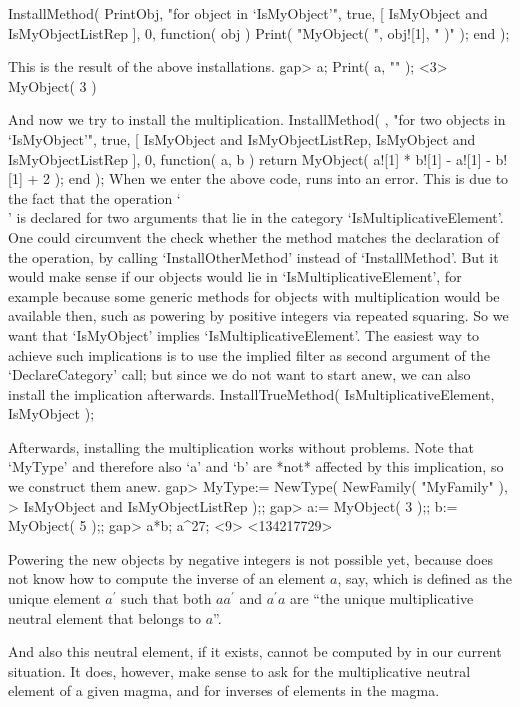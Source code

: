 InstallMethod( PrintObj,
    "for object in `IsMyObject'",
    true,
    [ IsMyObject and IsMyObjectListRep ], 0,
    function( obj )
    Print( "MyObject( ", obj![1], " )" );
    end );
\endtt

This is the result of the above installations.
\begintt
gap> a; Print( a, "\n" );
<3>
MyObject( 3 )
\endtt

And now we try to install the multiplication.
\begintt
InstallMethod( \*,
    "for two objects in `IsMyObject'",
    true,
    [ IsMyObject and IsMyObjectListRep,
      IsMyObject and IsMyObjectListRep ], 0,
    function( a, b )
    return MyObject( a![1] * b![1] - a![1] - b![1] + 2 );
    end );
\endtt
When we enter the above code, {\GAP} runs into an error.
This is due to the fact that the operation `\\\*' is declared for
two arguments that lie in the category `IsMultiplicativeElement'.
One could circumvent the check whether the method matches the
declaration of the operation, by calling `InstallOtherMethod'
instead of `InstallMethod'.
But it would make sense if our objects would lie in
`IsMultiplicativeElement', for example because some generic methods
for objects with multiplication would be available then,
such as powering by positive integers via repeated squaring.
So we want that `IsMyObject' implies `IsMultiplicativeElement'.
The easiest way to achieve such implications is to use the
implied filter as second argument of the `DeclareCategory' call;
but since we do not want to start anew,
we can also install the implication afterwards.
\begintt
InstallTrueMethod( IsMultiplicativeElement, IsMyObject );
\endtt

Afterwards, installing the multiplication works without problems.
Note that `MyType' and therefore also `a' and `b' are *not*
affected by this implication, so we construct them anew.
\begintt
gap> MyType:= NewType( NewFamily( "MyFamily" ),
>                      IsMyObject and IsMyObjectListRep );;
gap> a:= MyObject( 3 );;  b:= MyObject( 5 );;
gap> a*b;  a^27;
<9>
<134217729>
\endtt

Powering the new objects by negative integers is not possible yet,
because {\GAP} does not know how to compute the inverse of an element $a$,
say, which is defined as the unique element $a^{\prime}$ such that both
$a a^{\prime}$ and $a^{\prime} a$ are ``the unique multiplicative neutral
element that belongs to $a$''.

And also this neutral element, if it exists,
cannot be computed by {\GAP} in our current situation.
It does, however, make sense to ask for the multiplicative neutral
element of a given magma, and for inverses of elements in the magma.

